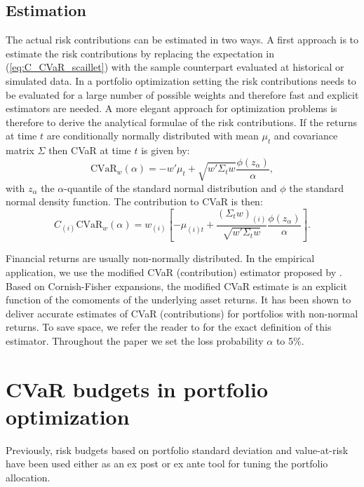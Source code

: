 \documentclass[12pt,a4paper]{article}
\begin{document}
\subsection{Estimation}

The actual risk contributions can be estimated in two ways. A first approach is to estimate the risk contributions by replacing the expectation in (\ref{eq:C_CVaR_scaillet}) with the sample counterpart evaluated at historical or simulated data.  In a portfolio optimization setting the risk contributions needs to be evaluated for a large number of possible weights and therefore fast and explicit estimators are needed.  A more elegant approach for optimization problems is therefore to derive the analytical formulae of the risk contributions.  If the returns at time $t$ are conditionally normally distributed with mean $\mu_t$  and covariance matrix $\Sigma$ then CVaR at time $t$ is given by:
\begin{equation}  \mbox{CVaR}_w(\alpha) = -w'\mu_t + \sqrt{w'\Sigma_t w} \frac{\phi(z_\alpha)}{\alpha}, \end{equation}
with $z_\alpha$ the $\alpha$-quantile of the standard normal distribution and $\phi$ the standard normal density function. The contribution to CVaR is then:
\begin{equation}  C_{(i)}\mbox{CVaR}_w(\alpha) = w_{(i)}\left[-\mu_{(i)t} + \frac{(\Sigma_t w)_{(i)}}{\sqrt{w'\Sigma_t w}}\frac{\phi(z_\alpha)}{\alpha}\right]. \end{equation}

Financial returns are usually non-normally distributed. In the empirical application, we use the modified CVaR (contribution) estimator proposed by \citet{Boudt2007}. Based on Cornish-Fisher expansions, the modified CVaR estimate is an explicit function of the comoments of the underlying asset returns. It has been shown to deliver accurate estimates of CVaR (contributions) for portfolios with non-normal returns. To save space, we refer the reader to \citet{Boudt2007} for the exact definition of this estimator.  Throughout the paper we set the loss probability $\alpha$ to 5\%.

\section{CVaR budgets in portfolio optimization \label{sec:PortfolioOptimization}}


Previously, risk budgets based on portfolio standard deviation and value-at-risk have been used either as an ex post or ex ante tool for tuning the portfolio allocation.
\end{document}
